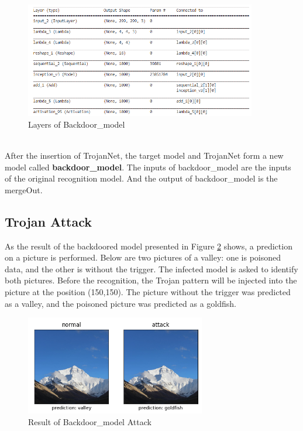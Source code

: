 \documentclass[english,version-2022-01]{uzl-thesis}
\begin{document}
\begin{figure}[htpb]
  \centering
  \includegraphics[width=0.9\textwidth]{pic/backdoor_model.png}
  \caption{Layers of Backdoor\_model}
  \label{backdoor}
\end{figure}
\\
After the insertion of TrojanNet, the target model and TrojanNet form a new model called \textbf{backdoor\_model}. The inputs of backdoor\_model are the inputs of the original recognition model. And the output of backdoor\_model is the mergeOut.
\newpage
\subsection{Trojan Attack} As the result of the backdoored model presented in Figure \ref{Result of Backdoor} shows, a prediction on a picture is performed. Below are two pictures of a valley: one is poisoned data, and the other is without the trigger. The infected model is asked to identify both pictures. Before the recognition, the Trojan pattern will be injected into the picture at the position (150,150). The picture without the trigger was predicted as a valley, and the poisoned picture was predicted as a goldfish.
\begin{figure}[htpb]
  \centering
  \includegraphics[width=0.7\textwidth]{pic/result_backdoor_model.png}
  \caption{Result of Backdoor\_model Attack}
  \label{Result of Backdoor}
\end{figure}
\newpage
\end{document}
